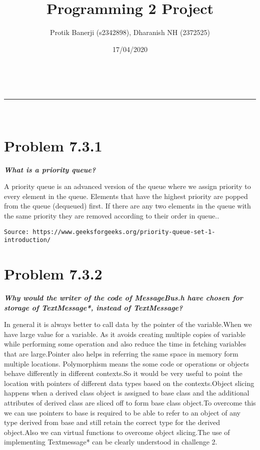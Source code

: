 \documentclass[a4paper,11pt]{article}
\makeatletter
\newcommand{\linia}{\rule{\linewidth}{0.5pt}}
\theoremstyle{mytheor}
\renewcommand{\maketitle}{
\begin{center}
\vspace{2ex}
{\huge \textsc{\@title}}
\vspace{1ex}
\\
\linia\\
\@author \hfill \@date
\vspace{4ex}
\end{center}
}
\makeatother
\begin{document}
\title{Programming 2 Project}

\author{Protik Banerji (s2342898), Dharanish NH (2372525)}

\date{17/04/2020}

\maketitle

\section*{Problem 7.3.1}

\textbf{\textit{What is a priority queue?}}

A priority queue is an advanced version of the queue where we assign priority to
every element in the queue. Elements that have the highest priority are popped
from the queue (dequeued) first. If there are any two elements in the queue with
the same priority they are removed according to their order in queue..

\texttt{Source: https://www.geeksforgeeks.org/priority-queue-set-1-introduction/}

\section*{Problem 7.3.2}
\textbf{\textit{Why would the writer of the code of MessageBus.h have chosen for storage of TextMessage*, instead of TextMessage?}}

In general it is always better to call data by the pointer of the variable.When
we have large value for a variable. As it avoids creating multiple copies of
variable while performing some operation and also reduce the time in fetching
variables that are large.Pointer also helps in referring the same space in
memory form multiple locations. Polymorphism means the some code or operations
or objects behave differently in different contexts.So it would be very useful
to point the location with pointers of different data types based on the
contexts.Object slicing happens when a derived class object is assigned to base
class and the additional attributes of derived class are sliced off to form base
class object.To overcome this we can use pointers to base is required to be able
to refer to an object of any type derived from base and still retain the correct
type for the derived object.Also we can virtual functions to overcome object
slicing.The use of implementing Textmessage* can be clearly understood in
challenge 2.
\end{document}

